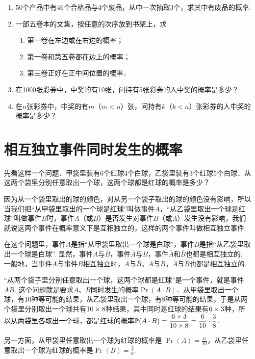\begin{enumerate}
\item 50个产品中有46个合格品与4个废品，从中一次抽取3个，求其中有废品的概率.
\item 一部五卷本的文集，按任意的次序放到书架上，求
\begin{enumerate}[(1)]
\item 第一卷在左边或在右边的概率；    \item 第一卷和第五卷都在边上的概率；    \item 第三卷正好在正中间位置的概率．
\end{enumerate}

\item 在1000张彩券中，中奖的有10张，问持有5张彩券的人中奖的概率是多少？
\item 在$n$张彩券中，中奖的有$m$（$m<n$）张，问持有$k$（$k<n$）张彩券的人中奖的概率是多少？
\end{enumerate}

\section{相互独立事件同时发生的概率}
先看这样一个问题．甲袋里装有6个红球4个白球，乙袋里装有3个红球5个白球．从这两个袋里分别任意取出一个球，这两个球都是红球的概率是多少？

因为从一个袋里取出的球的颜色，对从另一个袋子取出的球的颜色没有影响，所以当我们把“从甲袋里取出的一个球是红球”叫做事件$A$，“从乙袋里取出一个球是红球”叫做事件$B$时，事件$A$（或$B$）是否发生对事件$B$（或$A$）发生没有影响，我们就说这两个事件在概率意义下是互相独立的，这样的两个事件叫做相互独立事件.

在这个问题里，事件$\overline{A}$是指“从甲袋里取出一个球是白球”，事件$\overline{B}$是指“从乙袋里取出一个球是白球”. 显然，事件$A$与$\overline{B}$，事件$\overline{A}$与$B$，事件$\overline{A}$和$\overline{B}$也都是相互独立的. 一般地，当事件$A$与事件$B$相互独立时，$A$与$\overline{B}$，$\overline{A}$与$B$，$\overline{A}$与$\overline{B}$也都是相互独立的.

“从两个袋子里分别任意取出一个球，这两个球都是红球”是一个事件，就是事件$AB$. 这个问题就是要求$A$、$B$同时发生的概率$\Pr(A\cdot B)$．从甲袋里取出一个球，有10种等可能的结果，从乙袋里取出一个球，有8种等可能的结果，于是从两个袋里分别取出一个球共有$10\times8$种结果，其中同时是红球的结果有$6\times3$种，所以从两袋里各取出一个球，都是红球的概率$\mathbb{P}(A\cdot B)=\dfrac{6\times3}{10\times 8}=\dfrac{6}{10}\cdot \dfrac{3}{8}$.

另一方面，从甲袋里任意取出一个球为红球的概率是
$\Pr(A)=\frac{6}{10}$，从乙袋里任意取出一个球为红球的概率是$\Pr(B)=\frac{3}{8}$.

